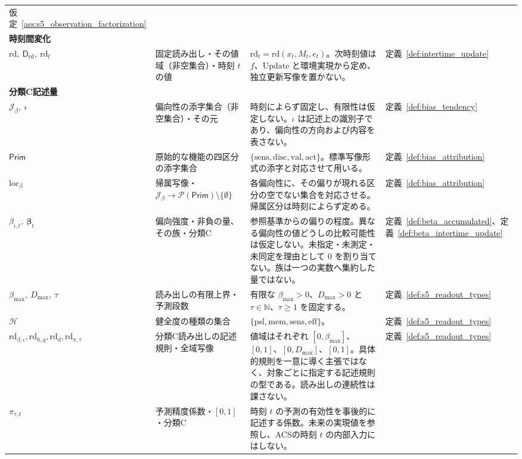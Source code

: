 \begin{longtable}{p{3.0cm} p{3.0cm} p{6.6cm} p{2.0cm}}
仮定~\ref{ass:s5_observation_factorization} \\[3pt]
\multicolumn{4}{l}{\textbf{時刻間変化}} \\[2pt]
$\mathrm{rd},\ \mathsf D_{\mathrm{rd}},\ \mathrm{rd}_t$ & 固定読み出し・その値域（非空集合）・時刻 $t$ の値 &
$\mathrm{rd}_t=\mathrm{rd}(x_t,M_t,e_t)$。次時刻値は $f$、$\mathrm{Update}$ と環境実現から定め、独立更新写像を置かない。 &
定義~\ref{def:intertime_update} \\[3pt]
\multicolumn{4}{l}{\textbf{分類C記述量}} \\[2pt]
$\mathcal J_{\beta},\ \iota$ & 偏向性の添字集合（非空集合）・その元 &
時刻によらず固定し、有限性は仮定しない。$\iota$ は記述上の識別子であり、偏向性の方向および内容を表さない。 &
定義~\ref{def:bias_tendency} \\[3pt]
$\mathsf{Prim}$ & 原始的な機能の四区分の添字集合 &
$\{\mathrm{sens},\mathrm{disc},\mathrm{val},\mathrm{act}\}$。標準写像形式の添字と対応させて用いる。 &
定義~\ref{def:bias_attribution} \\[3pt]
$\mathrm{loc}_{\beta}$ & 帰属写像・$\mathcal J_{\beta}\to\mathcal P(\mathsf{Prim})\setminus\{\emptyset\}$ &
各偏向性に、その偏りが現れる区分の空でない集合を対応させる。帰属区分は時刻によらず定める。 &
定義~\ref{def:bias_attribution} \\[3pt]
$\beta_{\iota,t},\ \boldsymbol{\beta}_t$ & 偏向強度・非負の量、その族・分類C &
参照基準からの偏りの程度。異なる偏向性の値どうしの比較可能性は仮定しない。未指定・未測定・未同定を理由として $0$ を割り当てない。族は一つの実数へ集約した量ではない。 &
定義~\ref{def:beta_accumulated}、定義~\ref{def:beta_intertime_update} \\[3pt]
$\beta_{\max},\ D_{\max},\ \tau$ & 読み出しの有限上界・予測段数 &
有限な $\beta_{\max}>0$、$D_{\max}>0$ と $\tau\in\mathbb N$、$\tau\ge1$ を固定する。 &
定義~\ref{def:s5_readout_types} \\[3pt]
$\mathcal H$ & 健全度の種類の集合 &
$\{\mathrm{psl},\mathrm{mem},\mathrm{sens},\mathrm{eff}\}$。 &
定義~\ref{def:s5_readout_types} \\[3pt]
$\mathrm{rd}_{\beta,\iota}, \mathrm{rd}_{h,q},\allowbreak \mathrm{rd}_d, \mathrm{rd}_{\pi,\tau}$ & 分類C読み出しの記述規則・全域写像 &
値域はそれぞれ $[0,\beta_{\max}]$、$[0,1]$、$[0,D_{\max}]$、$[0,1]$。具体的規則を一意に導く主張ではなく、対象ごとに指定する記述規則の型である。読み出しの連続性は課さない。 &
定義~\ref{def:s5_readout_types} \\[3pt]
$\pi_{\tau,t}$ & 予測精度係数・$[0,1]$・分類C &
時刻 $t$ の予測の有効性を事後的に記述する係数。未来の実現値を参照し、ACSの時刻 $t$ の内部入力にはしない。 &

\end{longtable}
